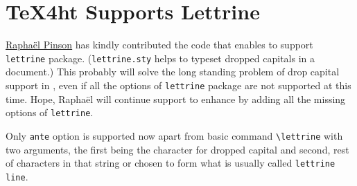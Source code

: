 \documentclass[a4paper]{article}
\let\hlink\href
\begin{document}
\section{\TeX4ht Supports Lettrine}

\hlink{http://www.raphink.info}{Rapha\"el Pinson} has kindly
contributed the code that enables \texht to support \Verb=lettrine=
package. (\Verb=lettrine.sty= helps to typeset dropped capitals in a
\latex document.) This probably will solve the long standing problem
of drop capital support in \texht, even if all the options of
\Verb=lettrine= package are not supported at this time. Hope,
Rapha\"el will continue support to enhance \texht by adding all the
missing options of \Verb=lettrine=.

Only \Verb=ante= option is supported now apart from basic command
\Verb=\lettrine= with two arguments, the first being the character for
dropped capital and second, rest of characters in that string or
chosen to form what is usually called \Verb=lettrine line=.
\end{document}
